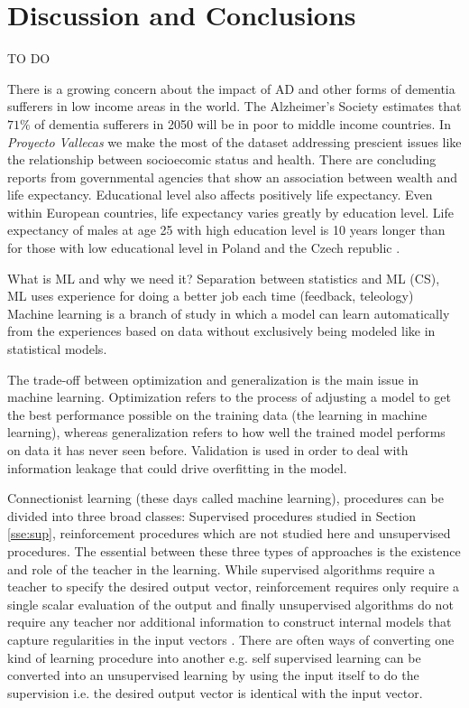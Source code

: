 \documentclass[11pt]{article}
\theoremstyle{definition}
\theoremstyle{remark}
\begin{document}
\section{Discussion and Conclusions}
\label{se:dis}
TO DO

There is a growing concern about the impact of AD and other forms of dementia sufferers in low income areas in the world.
The Alzheimer’s Society estimates that $71\%$ of dementia sufferers in 2050 will be in poor to middle income countries.
In \emph{Proyecto Vallecas} we make the most of the dataset addressing prescient issues like the relationship between socioecomic status and health. There are concluding reports from governmental agencies that show an association between wealth and life expectancy. 
Educational level also affects positively life expectancy. Even within European countries, life expectancy varies greatly by education level. Life expectancy of males at age 25 with high education level is 10 years longer than for those with low educational level in Poland and the Czech republic \cite{imf2018}. 



What is ML and why we need it? Separation between statistics and ML (CS), ML uses experience for doing a better job each time (feedback, teleology)
Machine learning is a branch of study in which a model can learn automatically from the experiences based on data without exclusively being modeled like in statistical models.

The trade-off between optimization and generalization is the main issue in machine learning. Optimization refers to the process of adjusting a model to get the best performance possible on the training data (the learning in machine learning), whereas generalization refers to how well the trained model performs on data it has never seen before.
Validation is used in order to deal with information leakage that could drive overfitting in the model.


Connectionist learning (these days called machine learning), procedures can be divided into three broad classes: Supervised procedures studied in Section \ref{sse:sup}, reinforcement procedures which are not studied here and unsupervised procedures.
The essential between these three types of approaches is the existence and role of the teacher in the learning.
While supervised algorithms require a teacher to specify the desired output vector, reinforcement requires only require a single scalar evaluation of the output and finally unsupervised algorithms do not require any teacher nor additional information to  construct internal models that capture regularities in the input vectors  \cite{hinton1990connectionist}. There are often ways of converting one kind of learning procedure into another e.g. self supervised learning can be converted into an unsupervised learning by using the input itself to do the supervision i.e. the desired output vector is identical with the input vector.
\end{document}
